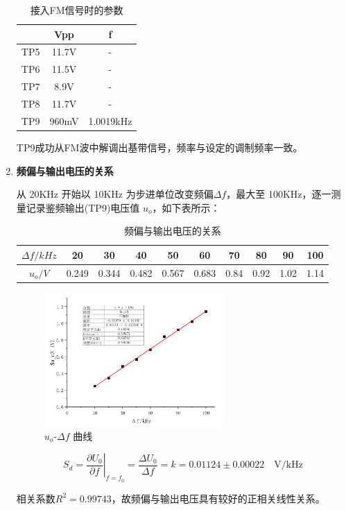 \documentclass[UTF8]{ctexart}
\begin{document}
\begin{enumerate}[(1)]
\begin{table}[!ht]
        \caption{接入FM信号时的参数}
        
        \begin{tabular}{|c|c|c|}
        \hline
            & Vpp   & f        \\ \hline
        TP5 & 11.7V & - \\ \hline
        TP6 & 11.5V & - \\ \hline
        TP7 & 8.9V  & - \\ \hline
        TP8 & 11.7V & - \\ \hline
        TP9 & 960mV & 1.0019kHz \\ \hline
        \end{tabular}
    \end{table}

    TP9成功从FM波中解调出基带信号，频率与设定的调制频率一致。
    
    \item \textbf{频偏与输出电压的关系}

    从 20KHz 开始以 10KHz 为步进单位改变频偏$\Delta f$，最大至 100KHz，逐一测量记录鉴频输出(TP9)电压值 $u_o$，如下表所示：

    \begin{table}[!ht]
        \centering

        \caption{频偏与输出电压的关系}
        
        \begin{tabular}{|c|c|c|c|c|c|c|c|c|c|}
        \hline
        $\Delta f/kHz$ & 20    & 30    & 40    & 50    & 60    & 70   & 80   & 90   & 100  \\ \hline
        $u_o/V$        & 0.249 & 0.344 & 0.482 & 0.567 & 0.683 & 0.84 & 0.92 & 1.02 & 1.14 \\ \hline
        \end{tabular}
    \end{table}

    \begin{figure}[H]
        \centering
        
        \includegraphics[width=0.65\textwidth]{pics/graph1.png}
        \caption{$u_o$-$\Delta f$ 曲线}\label{fig:graph1}
    \end{figure}
    $$\left.S_d= \dfrac{\partial U_0}{\partial f}\right|_{f=f_0}=\dfrac{\Delta U_0}{\Delta f}=k=0.01124 \pm 0.00022 \quad \mathrm{V/kHz}$$

    相关系数$R^2=0.99743$，故频偏与输出电压具有较好的正相关线性关系。
    
\end{enumerate}
\end{document}

